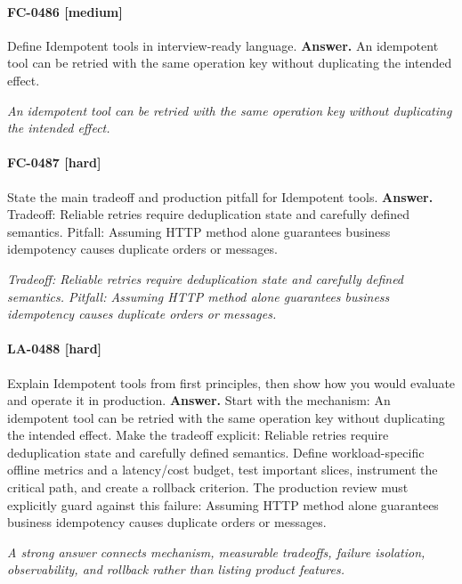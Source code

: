 \paragraph{FC-0486 [medium]} Define Idempotent tools in interview-ready language.
\noindent\textbf{Answer.} An idempotent tool can be retried with the same operation key without duplicating the intended effect.
\par\textit{An idempotent tool can be retried with the same operation key without duplicating the intended effect.}
\paragraph{FC-0487 [hard]} State the main tradeoff and production pitfall for Idempotent tools.
\noindent\textbf{Answer.} Tradeoff: Reliable retries require deduplication state and carefully defined semantics. Pitfall: Assuming HTTP method alone guarantees business idempotency causes duplicate orders or messages.
\par\textit{Tradeoff: Reliable retries require deduplication state and carefully defined semantics. Pitfall: Assuming HTTP method alone guarantees business idempotency causes duplicate orders or messages.}
\paragraph{LA-0488 [hard]} Explain Idempotent tools from first principles, then show how you would evaluate and operate it in production.
\noindent\textbf{Answer.} Start with the mechanism: An idempotent tool can be retried with the same operation key without duplicating the intended effect. Make the tradeoff explicit: Reliable retries require deduplication state and carefully defined semantics. Define workload-specific offline metrics and a latency/cost budget, test important slices, instrument the critical path, and create a rollback criterion. The production review must explicitly guard against this failure: Assuming HTTP method alone guarantees business idempotency causes duplicate orders or messages.
\par\textit{A strong answer connects mechanism, measurable tradeoffs, failure isolation, observability, and rollback rather than listing product features.}
